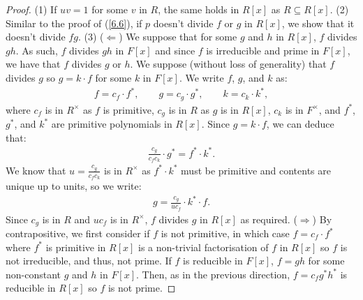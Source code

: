 \begin{proof}
    (1) If $uv = 1$ for some $v$ in $R$, the same holds in $R[x]$ as $R \subseteq R[x]$.
    \bs
    (2) Similar to the proof of (\ref{6.6}), if $p$ doesn't divide $f$ or $g$ in $R[x]$,
    we show that it doesn't divide $fg$.
    \bs
    (3) ($\Longleftarrow$) We suppose that for some $g$ and $h$ in $R[x]$, $f$ divides $gh$.
    As such, $f$ divides $gh$ in $F[x]$ and since $f$ is irreducible and prime in $F[x]$,
    we have that $f$ divides $g$ or $h$. We suppose (without loss of generality) that $f$
    divides $g$ so $g = k \cdot f$ for some $k$ in $F[x]$. We write $f$, $g$, and $k$
    as: \begin{align*}
        f = c_f \cdot f^\ast, \qquad
        g = c_g \cdot g^\ast, \qquad
        k = c_k \cdot k^\ast,
    \end{align*} where $c_f$ is in $R^\times$ as $f$ is primitive, $c_g$ is in
    $R$ as $g$ is in $R[x]$, $c_k$ is in $F^\times$, and $f^\ast$, $g^\ast$, and 
    $k^\ast$ are primitive polynomials in $R[x]$. Since $g = k \cdot f$,
    we can deduce that: \begin{align*}
        \frac{c_g}{c_fc_k} \cdot g^\ast = f^\ast \cdot k^\ast.
    \end{align*} We know that $u = \frac{c_g}{c_fc_k}$ is in $R^\times$ as
    $f^\ast \cdot k^\ast$ must be primitive and contents are unique up to units, so we
    write: \begin{align*}
        g = \frac{c_g}{uc_f} \cdot k^\ast \cdot f.
    \end{align*} Since $c_g$ is in $R$ and $uc_f$ is in $R^\times$, $f$ divides $g$ in
    $R[x]$ as required.
    \bs
    ($\Longrightarrow$) By contrapositive, we first consider if $f$ is not primitive,
    in which case $f = c_f \cdot f^\ast$ where $f^\ast$ is primitive in $R[x]$ is a non-trivial
    factorisation of $f$ in $R[x]$ so $f$ is not irreducible, and thus, not prime.
    If $f$ is reducible in $F[x]$, $f = gh$ for some non-constant $g$ and $h$ in $F[x]$.
    Then, as in the previous direction, $f = c_f g^\ast h^\ast$ is reducible in $R[x]$
    so $f$ is not prime.
\end{proof}
